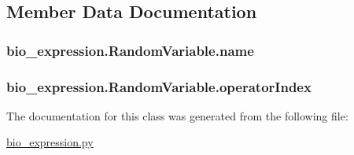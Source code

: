 \subsection{Member Data Documentation}
\hypertarget{classbio__expression_1_1_random_variable_adb0d67ebbf26c734c2675db7243b7e50}{
\subsubsection[{name}]{\setlength{\rightskip}{0pt plus 5cm}bio\+\_\+expression.\+Random\+Variable.\+name}}\label{classbio__expression_1_1_random_variable_adb0d67ebbf26c734c2675db7243b7e50}
\hypertarget{classbio__expression_1_1_random_variable_aa36861c700b320e1c2557eea1e8011c3}{
\subsubsection[{operator\+Index}]{\setlength{\rightskip}{0pt plus 5cm}bio\+\_\+expression.\+Random\+Variable.\+operator\+Index}}\label{classbio__expression_1_1_random_variable_aa36861c700b320e1c2557eea1e8011c3}


The documentation for this class was generated from the following file\+:\begin{DoxyCompactItemize}
\item 
\hyperlink{bio__expression_8py}{bio\+\_\+expression.\+py}\end{DoxyCompactItemize}
